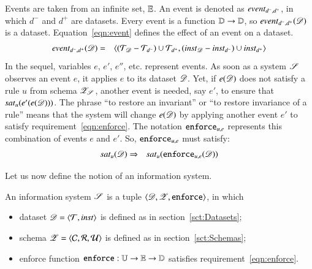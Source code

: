 \documentclass{elsarticle}
\begin{document}
   Events are taken from an infinite set, $\mathbb{E}$.
   An event is denoted as $\text{\it event\/}_{d^-,d^+}$, in which $d^-$ and $d^+$ are datasets.
   Every event is a function $\mathbb{D}\rightarrow\mathbb{D}$, so $\text{\it event\/}_{d^-,d^+}(\mathscr{D})$ is a dataset.
   Equation~\ref{eqn:event} defines the effect of an event on a dataset.
\begin{eqnarray}
      \text{\it event\/}_{d^-,d^+}(\mathscr{D})&=&\langle(\mathcal{T}_{\mathscr{D}}-\mathcal{T}_{d^-})\cup\mathcal{T}_{d^+},(\mathbin{\text{\it inst\/}}_{\mathscr{D}}-\mathbin{\text{\it inst\/}}_{d^-})\cup\mathbin{\text{\it inst\/}}_{d^+}\rangle
\label{eqn:event}
\end{eqnarray}
   In the sequel, variables $e$, $e'$, $e''$, etc. represent events.
   As soon as a system $\mathscr{S}$ observes an event $e$,
   it applies $e$ to its dataset $\mathscr{D}$.
   Yet, if $e(\mathscr{D})$ does not satisfy a rule $u$ from schema $\mathscr{Z}_{\mathscr{S}}$,
   another event is needed, say $e'$, to ensure that $\text{\it sat\/}_{u}(e'(e(\mathscr{D})))$.
   The phrase ``to restore an invariant'' or ``to restore invariance of a rule''
   means that the system will change $e(\mathscr{D})$ by applying another event $e'$ to satisfy requirement~\ref{eqn:enforce}.
   The notation $\mathbin{{\tt enforce}}_{u,e}$ represents this combination of events $e$ and $e'$.
   So, $\mathbin{{\tt enforce}}_{u,e}$ must satisfy:
\begin{eqnarray}
   \text{\it sat\/}_{u}(\mathscr{D})&\Rightarrow&\text{\it sat\/}_{u}({\tt enforce}_{u,e}(\mathscr{D}))
\label{eqn:enforce}
\end{eqnarray}

   Let us now define the notion of an information system.
\begin{definition}
\label{def:information system}
\item An information system $\mathscr{S}$ is a tuple $\langle{\mathscr{D}},{\mathscr{Z}},{\mathbin{{\tt enforce}}}\rangle$, in which
\begin{itemize}
   \item dataset $\mathscr{D}=\langle{\mathcal{T}},{\mathbin{\text{\it inst\/}}}\rangle$ is defined as in section~\ref{sct:Datasets};
   \item schema $\mathscr{Z}=\langle{\mathcal{C}},{\mathcal{R}},{\mathcal{U}}\rangle$ is defined as in section~\ref{sct:Schemas};
   \item enforce function ${\mathbin{{\tt enforce}}}:\mathbb{U}\rightarrow\mathbb{E}\rightarrow\mathbb{D}$ satisfies requirement~\ref{eqn:enforce}.
\end{itemize}
\end{definition}
\end{document}

